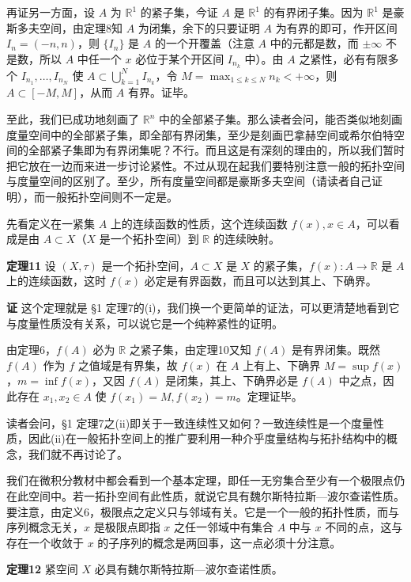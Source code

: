 再证另一方面，设 $A$ 为 $\mathbb R^1$ 的紧子集，今证 $A$ 是 $\mathbb R^1$ 的有界闭子集。因为 $\mathbb R^1$ 是豪斯多夫空间，由定理8知 $A$ 为闭集，余下的只要证明 $A$ 为有界的即可，作开区间 $I_n=(-n,n)$，则 $\{I_n\}$ 是 $A$ 的一个开覆盖（注意 $A$ 中的元都是数，而 $\pm\infty$ 不是数，所以 $A$ 中任一个 $x$ 必位于某个开区间 $I_{n_k}$ 中）。由 $A$ 之紧性，必有有限多个 $I_{n_1},\ldots,I_{n_N}$ 使 $A\subset\bigcup_{k=1}^N I_{n_k}$，令 $M=\max_{1\le k\le N}n_k<+\infty$，则 $A\subset[-M,M]$，从而 $A$ 有界。证毕。

至此，我们已成功地刻画了 $\mathbb R^n$ 中的全部紧子集。那么读者会问，能否类似地刻画度量空间中的全部紧子集，即全部有界闭集，至少是刻画巴拿赫空间或希尔伯特空间的全部紧子集即为有界闭集呢？不行。而且这是有深刻的理由的，所以我们暂时把它放在一边而来进一步讨论紧性。不过从现在起我们要特别注意一般的拓扑空间与度量空间的区别了。至少，所有度量空间都是豪斯多夫空间（请读者自己证明），而一般拓扑空间则不一定是。

先看定义在一紧集 $A$ 上的连续函数的性质，这个连续函数 $f(x),x\in A$，可以看成是由 $A\subset X$（$X$ 是一个拓扑空间）到 $\mathbb R$ 的连续映射。

\noindent\textbf{定理11}\quad
设 $(X,\tau)$ 是一个拓扑空间，$A\subset X$ 是 $X$ 的紧子集，$f(x):A\to\mathbb R$ 是 $A$ 上的连续函数，这时 $f(x)$ 必定是有界函数，而且可以达到其上、下确界。

\noindent\textbf{证}\quad
这个定理就是 §1 定理7的(i)，我们换一个更简单的证法，可以更清楚地看到它与度量性质没有关系，可以说它是一个纯粹紧性的证明。

由定理6，$f(A)$ 必为 $\mathbb R$ 之紧子集，由定理10又知 $f(A)$ 是有界闭集。既然 $f(A)$ 作为 $f$ 之值域是有界集，故 $f(x)$ 在 $A$ 上有上、下确界 $M=\sup f(x)$，$m=\inf f(x)$，又因 $f(A)$ 是闭集，其上、下确界必是 $f(A)$ 中之点，因此存在 $x_1,x_2\in A$ 使 $f(x_1)=M,f(x_2)=m$。定理证毕。

读者会问，§1 定理7之(ii)即关于一致连续性又如何？一致连续性是一个度量性质，因此(ii)在一般拓扑空间上的推广要利用一种介乎度量结构与拓扑结构中的概念，我们就不再讨论了。

我们在微积分教材中都会看到一个基本定理，即任一无穷集合至少有一个极限点仍在此空间中。若一拓扑空间有此性质，就说它具有魏尔斯特拉斯—波尔查诺性质。要注意，由定义6，极限点之定义只与邻域有关。它是一个一般的拓扑性质，而与序列概念无关，$x$ 是极限点即指 $x$ 之任一邻域中有集合 $A$ 中与 $x$ 不同的点，这与存在一个收敛于 $x$ 的子序列的概念是两回事，这一点必须十分注意。

\noindent\textbf{定理12}\quad
紧空间 $X$ 必具有魏尔斯特拉斯—波尔查诺性质。

